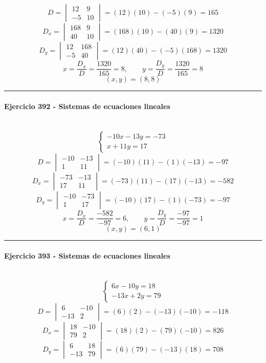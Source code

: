 \documentclass[10pt,a4paper]{article}
\newcommand{\res}[1]{\paragraph{#1}\mbox{}\\[-1.2em]}
\begin{document}
\[ D=\begin{vmatrix}12&9\\-5&10\end{vmatrix}=(12)(10)-(-5)(9)=165 \]
\[ D_x=\begin{vmatrix}168&9\\40&10\end{vmatrix}=(168)(10)-(40)(9)=1320 \]
\[ D_y=\begin{vmatrix}12&168\\-5&40\end{vmatrix}=(12)(40)-(-5)(168)=1320 \]
\[ x=\frac{D_x}{D}=\frac{1320}{165}=8,\qquad y=\frac{D_y}{D}=\frac{1320}{165}=8 \]
\[ \boxed{(x,y)=(8,8)} \]
\vspace{1mm}\hrule\vspace{2mm}
\res{Ejercicio 392 - Sistemas de ecuaciones lineales}
\[ \begin{cases}- 10 x - 13 y=-73\\x + 11 y=17\end{cases} \]
\[ D=\begin{vmatrix}-10&-13\\1&11\end{vmatrix}=(-10)(11)-(1)(-13)=-97 \]
\[ D_x=\begin{vmatrix}-73&-13\\17&11\end{vmatrix}=(-73)(11)-(17)(-13)=-582 \]
\[ D_y=\begin{vmatrix}-10&-73\\1&17\end{vmatrix}=(-10)(17)-(1)(-73)=-97 \]
\[ x=\frac{D_x}{D}=\frac{-582}{-97}=6,\qquad y=\frac{D_y}{D}=\frac{-97}{-97}=1 \]
\[ \boxed{(x,y)=(6,1)} \]
\vspace{1mm}\hrule\vspace{2mm}
\res{Ejercicio 393 - Sistemas de ecuaciones lineales}
\[ \begin{cases}6 x - 10 y=18\\- 13 x + 2 y=79\end{cases} \]
\[ D=\begin{vmatrix}6&-10\\-13&2\end{vmatrix}=(6)(2)-(-13)(-10)=-118 \]
\[ D_x=\begin{vmatrix}18&-10\\79&2\end{vmatrix}=(18)(2)-(79)(-10)=826 \]
\[ D_y=\begin{vmatrix}6&18\\-13&79\end{vmatrix}=(6)(79)-(-13)(18)=708 \]
\end{document}

